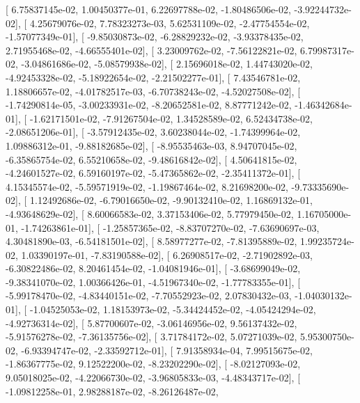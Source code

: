\documentclass{article}
\begin{document}
       [  6.75837145e-02,   1.00450377e-01,   6.22697788e-02,
         -1.80486506e-02,  -3.92244732e-02],
       [  4.25679076e-02,   7.78323273e-03,   5.62531109e-02,
         -2.47754554e-02,  -1.57077349e-01],
       [ -9.85030873e-02,  -6.28829232e-02,  -3.93378435e-02,
          2.71955468e-02,  -4.66555401e-02],
       [  3.23009762e-02,  -7.56122821e-02,   6.79987317e-02,
         -3.04861686e-02,  -5.08579938e-02],
       [  2.15696018e-02,   1.44743020e-02,  -4.92453328e-02,
         -5.18922654e-02,  -2.21502277e-01],
       [  7.43546781e-02,   1.18806657e-02,  -4.01782517e-03,
         -6.70738243e-02,  -4.52027508e-02],
       [ -1.74290814e-05,  -3.00233931e-02,  -8.20652581e-02,
          8.87771242e-02,  -1.46342684e-01],
       [ -1.62171501e-02,  -7.91267504e-02,   1.34528589e-02,
          6.52434738e-02,  -2.08651206e-01],
       [ -3.57912435e-02,   3.60238044e-02,  -1.74399964e-02,
          1.09886312e-01,  -9.88182685e-02],
       [ -8.95535463e-03,   8.94707045e-02,  -6.35865754e-02,
          6.55210658e-02,  -9.48616842e-02],
       [  4.50641815e-02,  -4.24601527e-02,   6.59160197e-02,
         -5.47365862e-02,  -2.35411372e-01],
       [  4.15345574e-02,  -5.59571919e-02,  -1.19867464e-02,
          8.21698200e-02,  -9.73335690e-02],
       [  1.12492686e-02,  -6.79016650e-02,  -9.90132410e-02,
          1.16869132e-01,  -4.93648629e-02],
       [  8.60066583e-02,   3.37153406e-02,   5.77979450e-02,
          1.16705000e-01,  -1.74263861e-01],
       [ -1.25857365e-02,  -8.83707270e-02,  -7.63690697e-03,
          4.30481890e-03,  -6.54181501e-02],
       [  8.58977277e-02,  -7.81395889e-02,   1.99235724e-02,
          1.03390197e-01,  -7.83190588e-02],
       [  6.26908517e-02,  -2.71902892e-03,  -6.30822486e-02,
          8.20461454e-02,  -1.04081946e-01],
       [ -3.68699049e-02,  -9.38341070e-02,   1.00366426e-01,
         -4.51967340e-02,  -1.77783355e-01],
       [ -5.99178470e-02,  -4.83440151e-02,  -7.70552923e-02,
          2.07830432e-03,  -1.04030132e-01],
       [ -1.04525053e-02,   1.18153973e-02,  -5.34424452e-02,
         -4.05424294e-02,  -4.92736314e-02],
       [  5.87700607e-02,  -3.06146956e-02,   9.56137432e-02,
         -5.91576278e-02,  -7.36135756e-02],
       [  3.71784172e-02,   5.07271039e-02,   5.95300750e-02,
         -6.93394747e-02,  -2.33592712e-01],
       [  7.91358934e-04,   7.99515675e-02,  -1.86367775e-02,
          9.12522200e-02,  -8.23202290e-02],
       [ -8.02127093e-02,   9.05018025e-02,  -4.22066730e-02,
         -3.96805833e-03,  -4.48343717e-02],
       [ -1.09812258e-01,   2.98288187e-02,  -8.26126487e-02,
\end{document}
